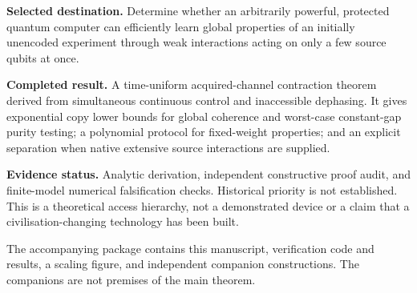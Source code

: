\documentclass[11pt,a4paper]{article}
\begin{document}
\begin{titlepage}
\vspace{10mm}{\huge\bfseries A physical access theorem\newline for quantum experiments\par}
\vspace{5mm}{\Large Local interaction order, hidden dephasing,\newline and the cost of learning global coherence\par}
\vspace{10mm}{\large 5 November 2026, Australia/Brisbane\par}\vspace{12mm}
\textbf{Selected destination.} Determine whether an arbitrarily powerful, protected quantum computer can efficiently learn global properties of an initially unencoded experiment through weak interactions acting on only a few source qubits at once.

\textbf{Completed result.} A time-uniform acquired-channel contraction theorem derived from simultaneous continuous control and inaccessible dephasing. It gives exponential copy lower bounds for global coherence and worst-case constant-gap purity testing; a polynomial protocol for fixed-weight properties; and an explicit separation when native extensive source interactions are supplied.

\textbf{Evidence status.} Analytic derivation, independent constructive proof audit, and finite-model numerical falsification checks. Historical priority is not established. This is a theoretical access hierarchy, not a demonstrated device or a claim that a civilisation-changing technology has been built.

\vfill The accompanying package contains this manuscript, verification code and results, a scaling figure, and independent companion constructions. The companions are not premises of the main theorem.
\end{titlepage}
\end{document}

